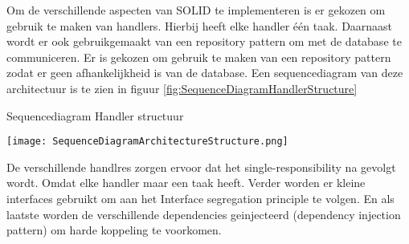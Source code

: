 \whitespace
Om de verschillende aspecten van SOLID te implementeren is er gekozen om gebruik te maken van handlers.
Hierbij heeft elke handler één taak.
Daarnaast wordt er ook gebruikgemaakt van een repository pattern om met de database te communiceren.
Er is gekozen om gebruik te maken van een repository pattern zodat er geen afhankelijkheid is van de database.
Een sequencediagram van deze architectuur is te zien in figuur \ref{fig:SequenceDiagramHandlerStructure}


\begin{graphic}
    \captionsetup{type=figure}
    \caption{Sequencediagram Handler structuur}
    \texttt{[image: SequenceDiagramArchitectureStructure.png]}
    \label{fig:SequenceDiagramHandlerStructure}
\end{graphic}

\whitespace
De verschillende handlres zorgen ervoor dat het single-responsibility na gevolgt wordt.
Omdat elke handler maar een taak heeft.
Verder worden er kleine interfaces gebruikt om aan het Interface segregation principle te volgen.
En als laatste worden de verschillende dependencies geinjecteerd (dependency injection pattern) om harde koppeling te voorkomen.


